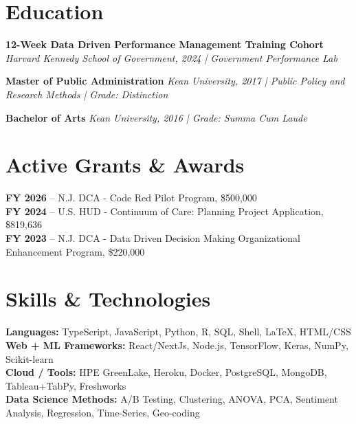 \documentclass[11pt,a4paper]{article} \usepackage[a4paper,margin=1.2cm]{geometry}
\begin{document}
\section*{Education}

\par\noindent\textbf{12-Week Data Driven Performance Management Training Cohort}  
\newline\textit{Harvard Kennedy School of Government, 2024 | Government Performance Lab}

\vspace{0.3em}

\par\noindent\textbf{Master of Public Administration}  
\newline\textit{Kean University, 2017 | Public Policy and Research Methods | Grade: Distinction}  

\vspace{0.3em}

\par\noindent\textbf{Bachelor of Arts}  
\newline\textit{Kean University, 2016 | Grade: Summa Cum Laude}  

\section*{Active Grants \& Awards}
\textbf{FY 2026} – N.J. DCA - Code Red Pilot Program, \$500,000 \\
\textbf{FY 2024} – U.S. HUD - Continuum of Care: Planning Project Application, \$819,636\\
\textbf{FY 2023} – N.J. DCA - Data Driven Decision Making Organizational Enhancement
Program, \$220,000

\section*{Skills \& Technologies}

\textbf{Languages:} TypeScript, JavaScript, Python, R, SQL, Shell, LaTeX, HTML/CSS \\
\textbf{Web + ML Frameworks:} React/NextJs, Node.js, TensorFlow, Keras, NumPy, Scikit-learn \\
\textbf{Cloud / Tools:} HPE GreenLake, Heroku, Docker, PostgreSQL, MongoDB, Tableau+TabPy, Freshworks \\
\textbf{Data Science Methods:} A/B Testing, Clustering, ANOVA, PCA, Sentiment Analysis,
Regression, Time-Series, Geo-coding \\
\end{document}
